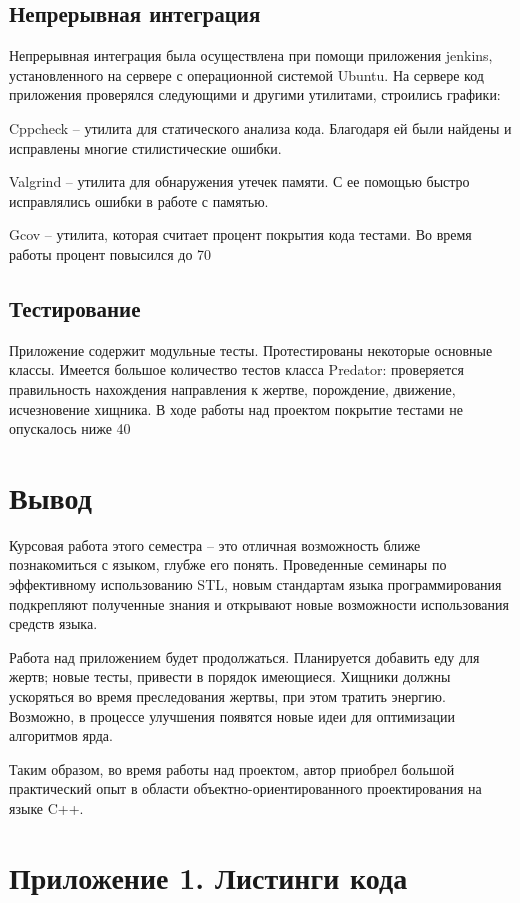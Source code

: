 \documentclass[a4paper]{article}
\begin{document}
\subsection{Непрерывная интеграция}
Непрерывная интеграция была осуществлена при помощи приложения jenkins, установленного на сервере с операционной системой Ubuntu. На сервере код приложения проверялся следующими и другими утилитами, строились графики: 

Cppcheck – утилита для статического анализа кода. Благодаря ей были найдены и исправлены многие стилистические ошибки. 

Valgrind – утилита для обнаружения утечек памяти. С ее помощью быстро исправлялись ошибки в работе с памятью.

Gcov – утилита, которая считает процент покрытия кода тестами. Во время работы процент повысился до 70%
\subsection{Тестирование}
Приложение содержит модульные тесты. Протестированы некоторые основные классы. Имеется большое количество тестов класса Predator: проверяется правильность нахождения направления к жертве, порождение, движение, исчезновение хищника. В ходе работы над проектом покрытие тестами не опускалось ниже 40%

\section{Вывод}
Курсовая работа этого семестра – это отличная возможность ближе познакомиться с языком, глубже его понять. Проведенные семинары по эффективному использованию STL, новым стандартам языка программирования подкрепляют полученные знания и открывают новые возможности использования средств языка. 

Работа над приложением будет продолжаться. Планируется добавить еду для жертв;  новые тесты, привести в порядок имеющиеся. Хищники должны ускоряться во время преследования жертвы, при этом тратить энергию. Возможно, в процессе улучшения появятся новые идеи для оптимизации алгоритмов ярда. 

Таким образом, во время работы над проектом, автор приобрел большой практический опыт в области объектно-ориентированного проектирования на языке C++. 

\section{Приложение 1. Листинги кода}
\end{document}

